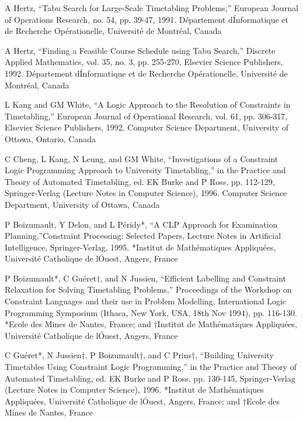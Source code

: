 \begin{thebibliography}{99}
A Hertz, “Tabu Search for Large-Scale Timetabling Problems,” European Journal of
Operations Research, no. 54, pp. 39-47, 1991. D\'epartement d\'Informatique et de
Recherche Op\'erationelle, Universit\'e de Montr\'eal, Canada

A Hertz, “Finding a Feasible Course Schedule using Tabu Search,” Discrete Applied
Mathematics, vol. 35, no. 3, pp. 255-270, Elsevier Science Publishers, 1992.
D\'epartement d\'Informatique et de Recherche Op\'erationelle, Universit\'e de
Montr\'eal, Canada

L Kang and GM White, “A Logic Approach to the Resolution of Constraints in
Timetabling,” European Journal of Operational Research, vol. 61, pp. 306-317, Elsevier
Science Publishers, 1992. Computer Science Department, University of Ottowa,
Ontario, Canada

C Cheng, L Kang, N Leung, and GM White, “Investigations of a Constraint Logic Programming Approach to University Timetabling,” in the Practice and Theory of
Automated Timetabling, ed. EK Burke and P Ross, pp. 112-129, Springer-Verlag (Lecture
Notes in Computer Science), 1996. Computer Science Department, University
of Ottawa, Canada

P Boizumault, Y Delon, and L P\'eridy*, ``A CLP Approach for Examination Planning,''Constraint Processing: Selected Papers, Lecture Notes in Artificial Intelligence,
Springer-Verlag, 1995. *Institut de Math\'ematiques Appliqu\'ees, Universit\'e Catholique
de l\'Ouest, Angers, France

P Boizumault*, C Gu\'eret†, and N Jussien, “Efficient Labelling and Constraint Relaxation for Solving Timetabling Problems,” Proceedings of the Workshop on Constraint
Languages and their use in Problem Modelling, International Logic Programming Symposium
(Ithaca, New York, USA, 18th Nov 1994), pp. 116-130. *Ecole des Mines de
Nantes, France; and †Institut de Math\'ematiques Appliqu\'ees, Universit\'e Catholique
de l\'Ouest, Angers, France

C Gu\'eret*, N Jussien†, P Boizumault†, and C Prins†, “Building University Timetables Using Constraint Logic Programming,” in the Practice and Theory of Automated
Timetabling, ed. EK Burke and P Ross, pp. 130-145, Springer-Verlag (Lecture Notes
in Computer Science), 1996. *Institut de Math\'ematiques Appliqu\'ees, Universit\'e
Catholique de l\'Ouest, Angers, France; and †Ecole des Mines de Nantes, France


\end{thebibliography}
